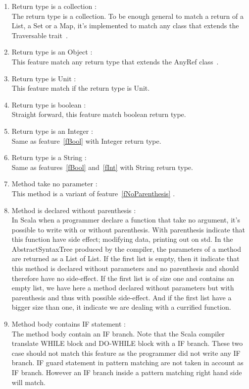 \documentclass[12pt]{article}
\begin{document}
\begin{enumerate}
\item Return type is a collection :\\
	The return type is a collection. To be enough general to match a return of a List, a Set or a Map, it's implemented to match any class that extends the Traversable trait~\cite{travers}.
\item Return type is an Object : \\
	This feature match any return type that extends the AnyRef class~\cite{anyRef}.
\item Return type is Unit :\\
	This feature match if the return type is Unit.
\item Return type is boolean : \label{fBool}\\
	Straight forward, this feature match boolean return type.
\item Return type is an Integer :\label{fInt}\\
	Same as feature~\ref{fBool} with Integer return type.
\item Return type is a String : \\
	Same as features~\ref{fBool} and~\ref{fInt} with String return type.
\item Method take no parameter :\label{fNoParam}\\
	This method is a variant of feature~\ref{fNoParenthesis} .
\item Method is declared without parenthesis :\label{fNoParenthesis}\\
In Scala when a programmer declare a function that take no argument, it's possible to write with or without parenthesis. With parenthesis indicate that this function have side effect; modifying data, printing out on std. In the AbstractSyntaxTree produced by the compiler, the parameters of a method are returned as a List of List. If the first list is empty, then it indicate that this method is declared without parameters and no parenthesis and should therefore have no side-effect. If the first list is of size one and contains an empty list, we have here a method declared without parameters but with parenthesis and thus with possible side-effect. And if the first list have a bigger size than one, it indicate we are dealing with a currified function.
\item Method body contains IF statement :\\
	The method body contain an IF branch. Note that the Scala compiler translate WHILE block and DO-WHILE block with a IF branch. These two case should not match this feature as the programmer did not write any IF branch. IF guard statement in pattern matching are not taken in account as IF branch. However an IF branch inside a pattern matching right hand side will match.\\

\end{enumerate}
\end{document}
